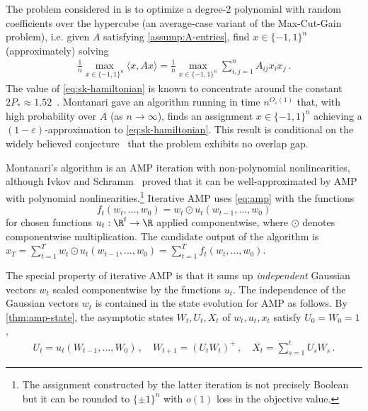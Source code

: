 \documentclass[12pt]{article}
\begin{document}
The problem considered in \cite{montanari2021optimization} is to
optimize a degree-2 polynomial with random
coefficients over the hypercube (an average-case variant of the Max-Cut-Gain problem), i.e. given
$A$ satisfying \cref{assump:A-entries}, find
$x\in \{-1,1\}^n$ (approximately) solving 
\begin{align}
    \label{eq:sk-hamiltonian}
    \frac 1 n \max_{x\in \{-1,1\}^n}\langle x, Ax\rangle = \frac 1 n \max_{x\in \{-1,1\}^n} \sum_{i,j=1}^n A_{ij} x_i x_j\,.
\end{align}
The value of \cref{eq:sk-hamiltonian} is known to concentrate around the constant $2P_*\approx 1.52$~\cite{Talagrand06,carmona2006universality}.
Montanari gave an algorithm running in time
$n^{O_{\varepsilon}(1)}$ that, with high
probability over $A$ (as $n\to\infty$), finds an assignment
$x\in \{-1,1\}^n$ achieving a $(1-\varepsilon)$-approximation to \cref{eq:sk-hamiltonian}. This result is
conditional on the widely believed conjecture~\cite[Assumption 2]{montanari2021optimization}
that the problem exhibits no overlap gap.

Montanari's algorithm is an AMP iteration with
non-polynomial nonlinearities, although Ivkov and
Schramm~\cite[Lemma B.4]{ivkov2023semidefinite} proved that it
can be well-approximated by AMP with
polynomial
nonlinearities.\footnote{The assignment constructed
by the latter iteration is not precisely Boolean but it can be rounded to
$\{\pm 1\}^n$ with $o(1)$ loss 
in the objective value.} Iterative AMP \cite{montanari2021optimization} uses \cref{eq:amp} with the functions
\begin{equation}
f_t(w_t, \dots, w_0) = w_t \odot u_t(w_{t-1}, \dots, w_0) \label{eq:iamp}
\end{equation}
for chosen functions $u_t : \R^{t} \to \R$ applied componentwise, where $\odot$ denotes componentwise multiplication.
The candidate output of the algorithm is $x_T = \sum_{t = 1}^T w_t \odot u_t(w_{t-1}, \dots, w_0) = \sum_{t = 1}^T f_t(w_t, \dots, w_0)$.


The special property of iterative AMP is that it sums up \emph{independent} Gaussian
vectors $w_t$ scaled componentwise by the functions $u_t$.
The independence of the Gaussian vectors $w_t$ is contained in the state evolution for AMP as follows.
By \cref{thm:amp-state}, the asymptotic states $W_t, U_t, X_t$ of $w_t, u_t, x_t$ satisfy $U_0=W_0=1$,
\begin{align*}
    U_t = u_t(W_{t-1},\ldots,W_0)\,,\quad W_{t+1} = (U_t W_t)^+\,, \quad X_t = \sum_{s = 1}^t U_sW_s\,.\label{eq:iterative-asymptotic}
\end{align*}
\end{document}
